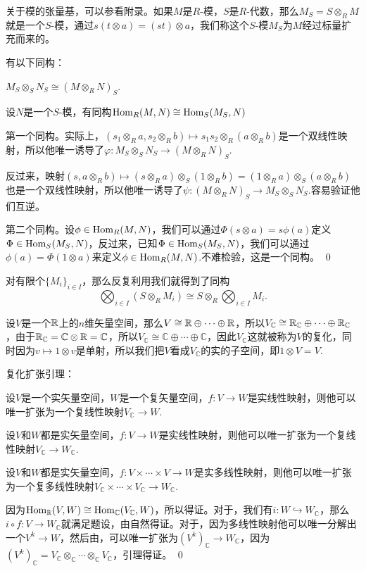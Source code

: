 \documentclass[10pt]{article}
\newcommand{\cc}{\mathbb{C}}
\begin{document}
\para 关于模的张量基，可以参看附录。如果$M$是$R$-模，$S$是$R$-代数，那么$M_S=S\otimes_R M$就是一个$S$-模，通过$s(t\otimes a)=(st)\otimes a$，我们称这个$S$-模$M_S$为$M$经过标量扩充而来的。

\lem 有以下同构：

 $M_S\otimes_S N_S\cong (M\otimes_R N)_S$.

 设$N$是一个$S$-模，有同构$\operatorname{Hom}_R(M,N)\cong \operatorname{Hom}_S(M_S,N)$

\proof 第一个同构。实际上，$(s_1\otimes_R a,s_2\otimes_R b)\mapsto s_1s_2\otimes_R(a\otimes_R b)$是一个双线性映射，所以他唯一诱导了$\varphi:M_S\otimes_S N_S\to (M\otimes_R N)_S$.

反过来，映射$(s,a\otimes_R b)\mapsto (s\otimes_R a)\otimes_S (1\otimes_R b)=(1\otimes_R a)\otimes_S (a\otimes_R b)$也是一个双线性映射，所以他唯一诱导了$\psi:(M\otimes_R N)_S\to M_S\otimes_S N_S$.容易验证他们互逆。

第二个同构。设$\phi\in \operatorname{Hom}_R(M,N)$，我们可以通过$\Phi(s\otimes a)=s\phi(a)$定义$\Phi\in \operatorname{Hom}_S(M_S,N)$，反过来，已知$\Phi\in \operatorname{Hom}_S(M_S,N)$，我们可以通过$\phi(a)=\Phi(1\otimes a)$来定义$\phi\in \operatorname{Hom}_R(M,N)$.不难检验，这是一个同构。 \qed

对有限个$\{M_i\}_{i\in I}$，那么反复利用我们就得到了同构
\[
\bigotimes_{i\in I} \left(S\otimes_RM_i\right)\cong S\otimes_R\bigotimes_{i\in I} M_i.
\]

\para 设$V$是一个$\mathbb{R}$上的$n$维矢量空间，那么$V\cong \mathbb{R}\oplus \cdots \oplus \mathbb{R}$，所以$V_{\cc}\cong \rr_{\cc}\oplus \cdots \oplus \rr_{\cc}$，由于$\rr_{\cc}=\cc\otimes \rr=\cc$，所以$V_{\cc}\cong \cc\oplus \cdots \oplus \cc$，因此$V_{\cc}$这就被称为$V$的复化，同时因为$v\mapsto 1\otimes v$是单射，所以我们把$V$看成$V_\cc$的实的子空间，即$1\otimes V=V$.

\lem 复化扩张引理：

设$V$是一个实矢量空间，$W$是一个复矢量空间，$f:V\to W$是实线性映射，则他可以唯一扩张为一个复线性映射$V_\cc\to W$.

设$V$和$W$都是实矢量空间，$f:V\to W$是实线性映射，则他可以唯一扩张为一个复线性映射$V_\cc\to W_\cc$.

设$V$和$W$都是实矢量空间，$f:V\times\cdots\times V\to W$是实多线性映射，则他可以唯一扩张为一个复多线性映射$V_\cc\times\cdots\times V_\cc\to W_\cc$.

\proof 
	因为$\Hom_\rr(V,W)\cong \Hom_\cc(V_\cc,W)$，所以得证。对于，我们有$i:W\hookrightarrow W_\cc$，那么$i\circ f:V\to W_\cc$就满足题设，由自然得证。对于，因为多线性映射他可以唯一分解出一个$V^k\to W$，然后由，可以唯一扩张为$(V^k)_\cc\to W_\cc$，因为$(V^k)_\cc=V_\cc\otimes_\cc \cdots\otimes_\cc V_\cc$，引理得证。
\qed
\end{document}
